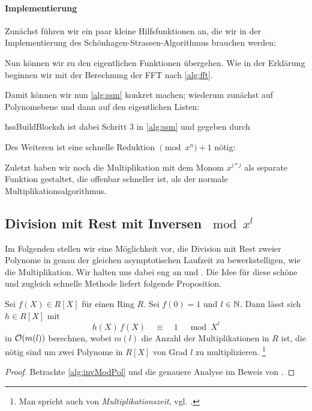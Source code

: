 \paragraph{Implementierung}
Zunächst führen wir ein paar kleine Hilfsfunktionen an, die wir in der
Implementierung des Schönhagen-Strassen-Algorithmus brauchen werden:

Nun können wir zu den eigentlichen Funktionen übergehen.
Wie in der Erklärung beginnen wir mit der Berechnung der FFT nach 
\autoref{alg:fft}.

Damit können wir nun \autoref{alg:ssm} konkret machen; wiederum zunächst auf
Polynomebene und dann auf den eigentlichen Listen:

ħssBuildBlocksħ ist dabei Schritt 3 in \autoref{alg:ssm} und gegeben durch

Des Weiteren ist eine schnelle Reduktion $\pmod x^n+1$ nötig:

Zuletzt haben wir noch die Multiplikation mit dem Monom $x^{j*j}$ als separate
Funktion gestaltet, die offenbar schneller ist, als der normale
Multiplikationsalgorithmus.

\subsection{Division mit Rest mit Inversen $\bmod x^l$}
Im Folgenden stellen wir eine Möglichkeit vor, die Division mit Rest zweier
Polynome in genau der gleichen asymptotischen Laufzeit zu bewerkstelligen, wie
die Multiplikation. Wir halten uns dabei eng an 
\cite{divHensel} und \cite{divHensel2}.
Die Idee für diese schöne und zugleich schnelle Methode liefert folgende 
Proposition.

\begin{prop}
  Sei $f(X) \in R[X]$ für einen Ring $R$. Sei $f(0) = 1$ und 
  $l \in \mathbb{N}$. Dann lässt sich $h \in R[X]$ mit
  \[ h(X)\, f(X) \quad\equiv\quad 1 \quad \bmod X^l\]
  in $\mathcal{O}(m(l))$ berechnen,
  wobei $m(l)$ die Anzahl der Multiplikationen in $R$ ist, die nötig sind 
  um zwei Polynome in $R[X]$ von Grad $l$ zu multiplizieren.%
  \footnote{Man spricht auch von \emph{Multiplikationszeit}, 
  vgl. \autocite[Definition 2]{divHensel}.}
\end{prop}
\begin{proof}
  Betrachte \autoref{alg:invModPol} und die genauere Analyse im Beweis von
  \autocite[Theorem 2]{divHensel}.
\end{proof}

